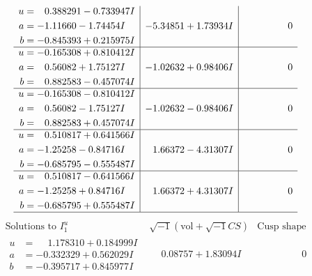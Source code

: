 \documentclass[1p]{elsarticle_modified}
\theoremstyle{definition}
\newcommand{\I}{\sqrt{-1}}
\begin{document}
$$\begin{array}{c|c|c}
\begin{aligned}
u &= \phantom{-}0.388291 - 0.733947 I \\
a &= -1.11660 - 1.74454 I \\
b &= -0.845393 + 0.215975 I\end{aligned}
 & -5.34851 + 1.73934 I & \phantom{-0.000000 } 0 \\ \hline\begin{aligned}
u &= -0.165308 + 0.810412 I \\
a &= \phantom{-}0.56082 + 1.75127 I \\
b &= \phantom{-}0.882583 - 0.457074 I\end{aligned}
 & -1.02632 + 0.98406 I & \phantom{-0.000000 } 0 \\ \hline\begin{aligned}
u &= -0.165308 - 0.810412 I \\
a &= \phantom{-}0.56082 - 1.75127 I \\
b &= \phantom{-}0.882583 + 0.457074 I\end{aligned}
 & -1.02632 - 0.98406 I & \phantom{-0.000000 } 0 \\ \hline\begin{aligned}
u &= \phantom{-}0.510817 + 0.641566 I \\
a &= -1.25258 - 0.84716 I \\
b &= -0.685795 - 0.555487 I\end{aligned}
 & \phantom{-}1.66372 - 4.31307 I & \phantom{-0.000000 } 0 \\ \hline\begin{aligned}
u &= \phantom{-}0.510817 - 0.641566 I \\
a &= -1.25258 + 0.84716 I \\
b &= -0.685795 + 0.555487 I\end{aligned}
 & \phantom{-}1.66372 + 4.31307 I & \phantom{-0.000000 } 0\\
 \hline 
 \end{array}$$\newpage$$\begin{array}{c|c|c}  
\text{Solutions to }I^u_{1}& \I (\text{vol} + \sqrt{-1}CS) & \text{Cusp shape}\\
 \hline 
\begin{aligned}
u &= \phantom{-}1.178310 + 0.184999 I \\
a &= -0.332329 + 0.562029 I \\
b &= -0.395717 + 0.845977 I\end{aligned}
 & \phantom{-}0.08757 + 1.83094 I & \phantom{-0.000000 } 0 \\ \hline\begin{aligned}

\end{aligned}
\end{array}$$
\end{document}

